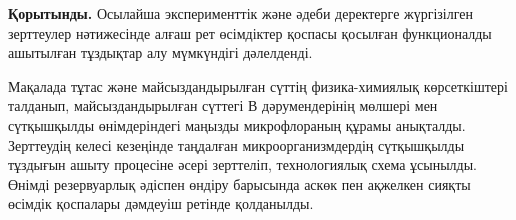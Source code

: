 {%

{\bfseries Қорытынды.} Осылайша эксперименттік және әдеби деректерге
жүргізілген зерттеулер нәтижесінде алғаш рет өсімдіктер қоспасы қосылған
функционалды ашытылған тұздықтар алу мүмкүндігі дәлелденді.

Мақалада тұтас және майсыздандырылған сүттің физика-химиялық
көрсеткіштері талданып, майсыздандырылған сүттегі В дәрумендерінің
мөлшері мен сүтқышқылды өнімдеріндегі маңызды микрофлораның құрамы
анықталды. Зерттеудің келесі кезеңінде таңдалған микроорганизмдердің
сүтқышқылды тұздығын ашыту процесіне әсері зерттеліп, технологиялық
схема ұсынылды. Өнімді резервуарлық әдіспен өндіру барысында аскөк пен
ақжелкен сияқты өсімдік қоспалары дәмдеуіш ретінде қолданылды.

}
